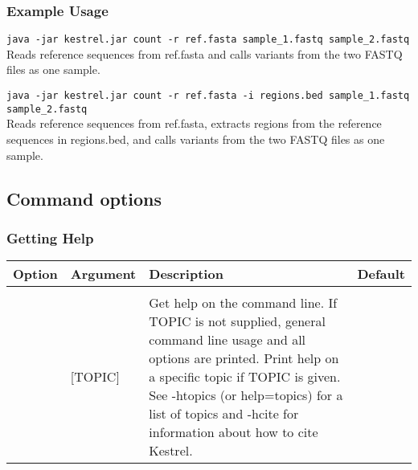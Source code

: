 \subsubsection{Example Usage}
\label{sec.cmdline.count.egusage}

\texttt{java -jar kestrel.jar count -r ref.fasta sample\_1.fastq sample\_2.fastq}\\
\hspace*{1cm}Reads reference sequences from ref.fasta and calls variants from the two FASTQ files as one sample.

\texttt{java -jar kestrel.jar count -r ref.fasta -i regions.bed sample\_1.fastq sample\_2.fastq}\\
\hspace*{1cm}Reads reference sequences from ref.fasta, extracts regions from the reference sequences in regions.bed, and calls variants from the two FASTQ files as one sample.


\subsection{Command options}
\label{sec.cmdline.opts}

\subsubsection{Getting Help}
\label{sec.cmdline.opts.help}

\begin{small}
	\begin{longtable}{|p{\optwidth}|p{\argwidth}|p{\dscwidth}|p{}|}
		\hline
		
		\textbf{Option} & \textbf{Argument} & \textbf{Description} & \textbf{Default} \\ \hline
	
		\optbox{\sopt{h}\\\lopt{help}} & [TOPIC] &
		Get help on the command line. If TOPIC is not supplied, general command line usage and all options are printed. Print help on a specific topic if TOPIC is given. See -htopics (or \ddash{}help=topics) for a list of topics and -hcite for information about how to cite Kestrel.
		&
		\\ \hline
		
	\end{longtable}
\end{small}


